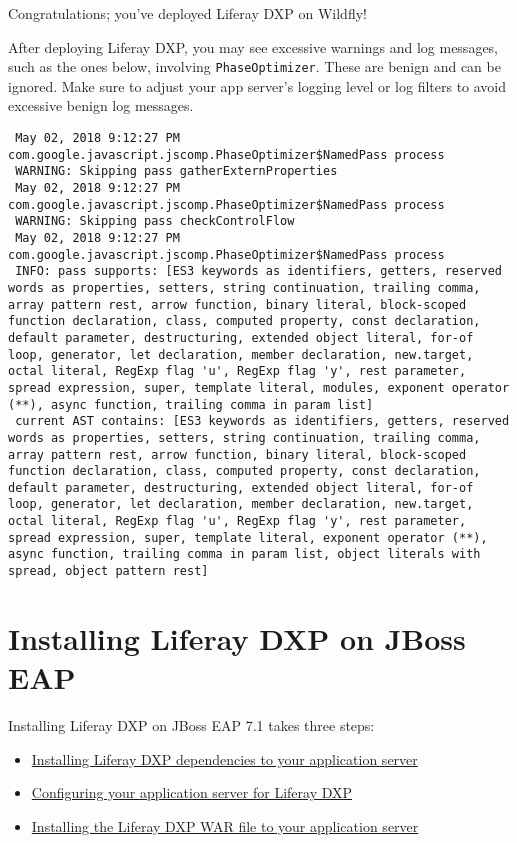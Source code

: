 Congratulations; you've deployed Liferay DXP on Wildfly!

\noindent\hrulefill

After deploying Liferay DXP, you may see excessive warnings and log
messages, such as the ones below, involving \texttt{PhaseOptimizer}.
These are benign and can be ignored. Make sure to adjust your app
server's logging level or log filters to avoid excessive benign log
messages.

\begin{verbatim}
 May 02, 2018 9:12:27 PM com.google.javascript.jscomp.PhaseOptimizer$NamedPass process
 WARNING: Skipping pass gatherExternProperties
 May 02, 2018 9:12:27 PM com.google.javascript.jscomp.PhaseOptimizer$NamedPass process
 WARNING: Skipping pass checkControlFlow
 May 02, 2018 9:12:27 PM com.google.javascript.jscomp.PhaseOptimizer$NamedPass process
 INFO: pass supports: [ES3 keywords as identifiers, getters, reserved words as properties, setters, string continuation, trailing comma, array pattern rest, arrow function, binary literal, block-scoped function declaration, class, computed property, const declaration, default parameter, destructuring, extended object literal, for-of loop, generator, let declaration, member declaration, new.target, octal literal, RegExp flag 'u', RegExp flag 'y', rest parameter, spread expression, super, template literal, modules, exponent operator (**), async function, trailing comma in param list]
 current AST contains: [ES3 keywords as identifiers, getters, reserved words as properties, setters, string continuation, trailing comma, array pattern rest, arrow function, binary literal, block-scoped function declaration, class, computed property, const declaration, default parameter, destructuring, extended object literal, for-of loop, generator, let declaration, member declaration, new.target, octal literal, RegExp flag 'u', RegExp flag 'y', rest parameter, spread expression, super, template literal, exponent operator (**), async function, trailing comma in param list, object literals with spread, object pattern rest]
\end{verbatim}

\section{Installing Liferay DXP on JBoss
EAP}\label{installing-liferay-dxp-on-jboss-eap}

Installing Liferay DXP on JBoss EAP 7.1 takes three steps:

\begin{itemize}
\tightlist
\item
  \hyperref[installing-dependencies]{Installing Liferay DXP dependencies
  to your application server}
\item
  \hyperref[configuring-jboss]{Configuring your application server for
  Liferay DXP}
\item
  \hyperref[deploying-product]{Installing the Liferay DXP WAR file to
  your application server}
\end{itemize}

